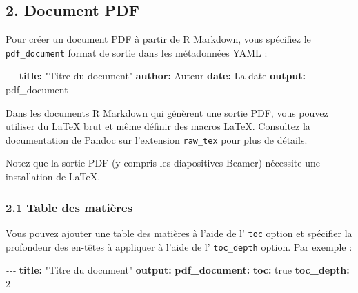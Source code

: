 \documentclass[
]{article}
\newenvironment{Shaded}{\begin{snugshade}}{\end{snugshade}}
\newcommand{\AttributeTok}[1]{\textcolor[rgb]{0.13,0.29,0.53}{#1}}
\newcommand{\CharTok}[1]{\textcolor[rgb]{0.31,0.60,0.02}{#1}}
\newcommand{\DecValTok}[1]{\textcolor[rgb]{0.00,0.00,0.81}{#1}}
\newcommand{\FunctionTok}[1]{\textcolor[rgb]{0.13,0.29,0.53}{\textbf{#1}}}
\newcommand{\KeywordTok}[1]{\textcolor[rgb]{0.13,0.29,0.53}{\textbf{#1}}}
\newcommand{\PreprocessorTok}[1]{\textcolor[rgb]{0.56,0.35,0.01}{\textit{#1}}}
\newcommand{\StringTok}[1]{\textcolor[rgb]{0.31,0.60,0.02}{#1}}
\begin{document}
\hypertarget{document-pdf}{%
\subsection{2. Document PDF}\label{document-pdf}}

Pour créer un document PDF à partir de R Markdown, vous spécifiez le
\texttt{pdf\_document} format de sortie dans les métadonnées YAML :

\begin{Shaded}
\begin{Highlighting}[]
\PreprocessorTok{{-}{-}{-}}
\FunctionTok{title}\KeywordTok{:}\AttributeTok{ }\StringTok{"Titre du document"}
\FunctionTok{author}\KeywordTok{:}\AttributeTok{ Auteur}
\FunctionTok{date}\KeywordTok{:}\AttributeTok{ La date}
\FunctionTok{output}\KeywordTok{:}\AttributeTok{ pdf\_document}
\PreprocessorTok{{-}{-}{-}}
\end{Highlighting}
\end{Shaded}

Dans les documents R Markdown qui génèrent une sortie PDF, vous pouvez
utiliser du LaTeX brut et même définir des macros LaTeX. Consultez la
documentation de Pandoc sur l'extension \texttt{raw\_tex} pour plus de
détails.

Notez que la sortie PDF (y compris les diapositives Beamer) nécessite
une installation de LaTeX.

\hypertarget{table-des-matiuxe8res-1}{%
\subsubsection{2.1 Table des matières}\label{table-des-matiuxe8res-1}}

Vous pouvez ajouter une table des matières à l'aide de l' \texttt{toc}
option et spécifier la profondeur des en-têtes à appliquer à l'aide de
l' \texttt{toc\_depth} option. Par exemple :

\begin{Shaded}
\begin{Highlighting}[]
\PreprocessorTok{{-}{-}{-}}
\FunctionTok{title}\KeywordTok{:}\AttributeTok{ }\StringTok{"Titre du document"}
\FunctionTok{output}\KeywordTok{:}
\AttributeTok{  }\FunctionTok{pdf\_document}\KeywordTok{:}
\AttributeTok{    }\FunctionTok{toc}\KeywordTok{:}\AttributeTok{ }\CharTok{true}
\AttributeTok{    }\FunctionTok{toc\_depth}\KeywordTok{:}\AttributeTok{ }\DecValTok{2}
\PreprocessorTok{{-}{-}{-}}
\end{Highlighting}
\end{Shaded}
\end{document}
